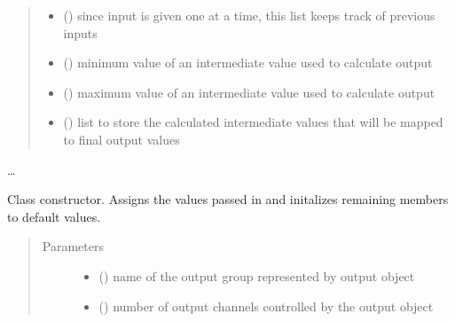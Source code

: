\documentclass[letterpaper,10pt,english]{sphinxmanual}
\begin{document}
\begin{fulllineitems}
\begin{quote}
\begin{description}
\begin{itemize}
\item {} 
\sphinxAtStartPar
{}(\sphinxstyleemphasis{{[}int{]}}) \textendash{} since input is given one at a 
time, this list keeps track of previous inputs

\item {} 
\sphinxAtStartPar
{}() \textendash{} minimum value of an intermediate 
value used to calculate output

\item {} 
\sphinxAtStartPar
{}() \textendash{} maximum value of an intermediate 
value used to calculate output

\item {} 
\sphinxAtStartPar
{}(\sphinxstyleemphasis{{[}int{]}}) \textendash{} list to store the calculated 
intermediate values that will be mapped to final output values

\end{itemize}

\end{description}\end{quote}

\sphinxAtStartPar
…

\sphinxAtStartPar
{}

\begin{fulllineitems}
\label{\detokenize{specific:EarOutput.EarOutput.__init__}}
\sphinxAtStartPar
Class constructor. Assigns the values passed in and initalizes remaining 
members to default values.
\begin{quote}\begin{description}
\item[{Parameters}] \leavevmode\begin{itemize}
\item {} 
\sphinxAtStartPar
{} () \textendash{} name of the output group represented by output object

\item {} 
\sphinxAtStartPar
{} () \textendash{} number of output channels controlled by the output 
object


\end{itemize}
\end{description}
\end{quote}
\end{fulllineitems}
\end{fulllineitems}
\end{document}
